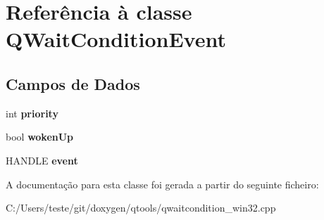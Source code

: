 \hypertarget{class_q_wait_condition_event}{\section{Referência à classe Q\-Wait\-Condition\-Event}
\label{class_q_wait_condition_event}
}
\subsection*{Campos de Dados}
\begin{DoxyCompactItemize}
\item 
\hypertarget{class_q_wait_condition_event_acec9ce2df15222151ad66fcb1d74eb9f}{int {\bfseries priority}}\label{class_q_wait_condition_event_acec9ce2df15222151ad66fcb1d74eb9f}

\item 
\hypertarget{class_q_wait_condition_event_a6d244ad6d46e1d7d4c74922896c7f526}{bool {\bfseries woken\-Up}}\label{class_q_wait_condition_event_a6d244ad6d46e1d7d4c74922896c7f526}

\item 
\hypertarget{class_q_wait_condition_event_a565d71e8ad36560cb72c7f6edd56ba63}{H\-A\-N\-D\-L\-E {\bfseries event}}\label{class_q_wait_condition_event_a565d71e8ad36560cb72c7f6edd56ba63}

\end{DoxyCompactItemize}


A documentação para esta classe foi gerada a partir do seguinte ficheiro\-:\begin{DoxyCompactItemize}
\item 
C\-:/\-Users/teste/git/doxygen/qtools/qwaitcondition\-\_\-win32.\-cpp\end{DoxyCompactItemize}
